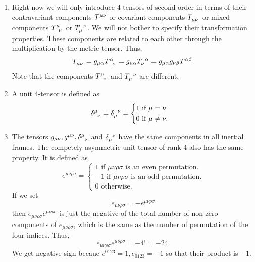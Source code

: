 \begin{enumerate}
\item Right now we will only introduce 4-tensors of second order in terms of their
contravariant components $\tensor{T}{^{\mu\nu}}$ or covariant components 
$\tensor{T}{_{\mu\nu}}$ or mixed components $\tensor{T}{^\mu_\nu}$ or 
$\tensor{T}{_\mu^\nu}$. We will not bother to specify their transformation properties.
These components are related to each other through the multiplication by the metric
tensor. Thus, 
\begin{equation}\label{c1e50}
\tensor{T}{_{\mu\nu}} = g_{\mu\alpha}\tensor{T}{^\alpha_\nu} =
g_{\mu\alpha}\tensor{T}{_\nu^\alpha} = g_{\mu\alpha}g_{\nu\beta}T^{\alpha\beta}.
\end{equation}
Note that the components $\tensor{T}{^\mu_\nu}$ and $\tensor{T}{_\mu^\nu}$ are 
different.

\item A unit 4-tensor is defined as
\begin{equation}\label{c1e51}
\tensor{\delta}{^\mu_\nu} = \tensor{\delta}{_\mu^\nu} = \begin{cases}
1 \text{  if  } \mu = \nu \\
0 \text{  if  } \mu \ne \nu.
\end{cases}
\end{equation}

\item The tensors $g_{\mu\nu}, g^{\mu\nu}, \tensor{\delta}{^\mu_\nu}$ and 
$\tensor{\delta}{_\mu^\nu}$ have the same components in all inertial frames. The 
competely asymmetric unit tensor of rank 4 also has the same property. It is
defined as
\begin{equation}\label{c1e52}
e^{\mu\nu\rho\sigma} = \begin{cases}
1 \text{  if  } \mu\nu\rho\sigma \text{  is an even permutation.} \\
-1 \text{  if  } \mu\nu\rho\sigma \text{  is an odd permutation.} \\
0 \text {  otherwise.}
\end{cases}
\end{equation}
If we set
\begin{equation}\label{c1e53}
e_{\mu\nu\rho\sigma} = -e^{\mu\nu\rho\sigma}
\end{equation}
then $e_{\mu\nu\rho\sigma}e^{\mu\nu\rho\sigma}$ is just the negative of the total 
number of non-zero components of $e_{\mu\nu\rho\sigma}$, which is the same as the
number of permutation of the four indices. Thus,
\begin{equation}\label{c1e54}
e_{\mu\nu\rho\sigma}e^{\mu\nu\rho\sigma} = -4! = -24.
\end{equation}
We get negative sign becaue $e^{0123} = 1, e_{0123} = -1$ so that their product 
is $-1$.


\end{enumerate}
